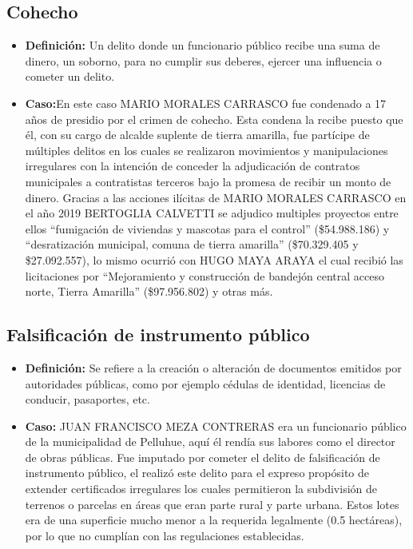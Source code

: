 \documentclass[letter,12pt]{article}
\begin{document}
		\subsection*{Cohecho}
			\begin{itemize}
				\item \textbf{Definición:} Un delito donde un funcionario público recibe una suma de dinero, un soborno, para no cumplir sus deberes, ejercer una influencia o cometer un delito.
	
				\item \textbf{Caso:}En este caso MARIO MORALES CARRASCO fue condenado a 17 años de presidio por el crimen de cohecho. Esta condena la recibe puesto que él, con su cargo de alcalde suplente de tierra amarilla, fue partícipe de múltiples delitos en los cuales se realizaron movimientos y manipulaciones irregulares con la intención de conceder la adjudicación de contratos municipales a contratistas terceros bajo la promesa de recibir un monto de dinero. Gracias a las acciones ilícitas de MARIO MORALES CARRASCO en el año 2019 BERTOGLIA CALVETTI se adjudico multiples proyectos entre ellos “fumigación de viviendas y mascotas para el control” (\$54.988.186) y “desratización municipal, comuna de tierra amarilla” (\$70.329.405 y \$27.092.557), lo mismo ocurrió con HUGO MAYA ARAYA el cual recibió las licitaciones por “Mejoramiento y construcción de bandejón central acceso norte, Tierra Amarilla” (\$97.956.802) y otras más.
			\end{itemize}
		\subsection*{Falsificación de instrumento público}
			\begin{itemize}
				\item \textbf{Definición:} Se refiere a la creación o alteración de documentos emitidos por autoridades públicas, como por ejemplo cédulas de identidad, licencias de conducir, pasaportes, etc.
			
				\item \textbf{Caso:} JUAN FRANCISCO MEZA CONTRERAS era un funcionario público de la municipalidad de Pelluhue, aquí él rendía sus labores como el director de obras públicas. Fue imputado por cometer el delito de falsificación de instrumento público, el realizó este delito para el expreso propósito de extender certificados irregulares los cuales permitieron la subdivisión de terrenos o parcelas en áreas que eran parte rural y parte urbana. Estos lotes era de una superficie mucho menor a la requerida legalmente (0.5 hectáreas), por lo que no cumplían con las regulaciones establecidas.
			\end{itemize}
\end{document}
